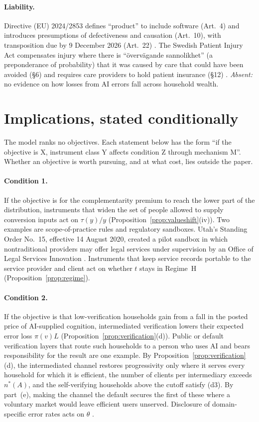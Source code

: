 \documentclass[12pt]{article}
\theoremstyle{remark}
\begin{document}
\paragraph{Liability.} Directive (EU) 2024/2853 defines ``product'' to include software (Art.~4) and introduces presumptions of defectiveness and causation (Art.~10), with transposition due by 9 December 2026 (Art.~22) \citep{eu2024pld}. The Swedish Patient Injury Act compensates injury where there is ``övervägande sannolikhet'' (a preponderance of probability) that it was caused by care that could have been avoided (§6) and requires care providers to hold patient insurance (§12) \citep{sweden1996patient}. \emph{Absent:} no evidence on how losses from AI errors fall across household wealth.

\section{Implications, stated conditionally}\label{sec:implications}

The model ranks no objectives. Each statement below has the form ``if the objective is X, instrument class Y affects condition Z through mechanism M''. Whether an objective is worth pursuing, and at what cost, lies outside the paper.

\paragraph{Condition 1.} If the objective is for the complementarity premium to reach the lower part of the distribution, instruments that widen the set of people allowed to supply conversion inputs act on $\tau(y)/y$ (Proposition~\ref{prop:valueshift}(iv)). Two examples are scope-of-practice rules and regulatory sandboxes. Utah's Standing Order No.~15, effective 14 August 2020, created a pilot sandbox in which nontraditional providers may offer legal services under supervision by an Office of Legal Services Innovation \citep{utah2020so15}. Instruments that keep service records portable to the service provider and client act on whether $t$ stays in Regime~H (Proposition~\ref{prop:regime}).

\paragraph{Condition 2.} If the objective is that low-verification households gain from a fall in the posted price of AI-supplied cognition, intermediated verification lowers their expected error loss $\pi(v)L$ (Proposition~\ref{prop:verification}(d)). Public or default verification layers that route such households to a person who uses AI and bears responsibility for the result are one example. By Proposition~\ref{prop:verification}(d), the intermediated channel restores progressivity only where it serves every household for which it is efficient, the number of clients per intermediary exceeds $n^*(A)$, and the self-verifying households above the cutoff satisfy (d3). By part~(e), making the channel the default secures the first of these where a voluntary market would leave efficient users unserved. Disclosure of domain-specific error rates acts on $\theta$ \citep{steyvers2025know}.
\end{document}
